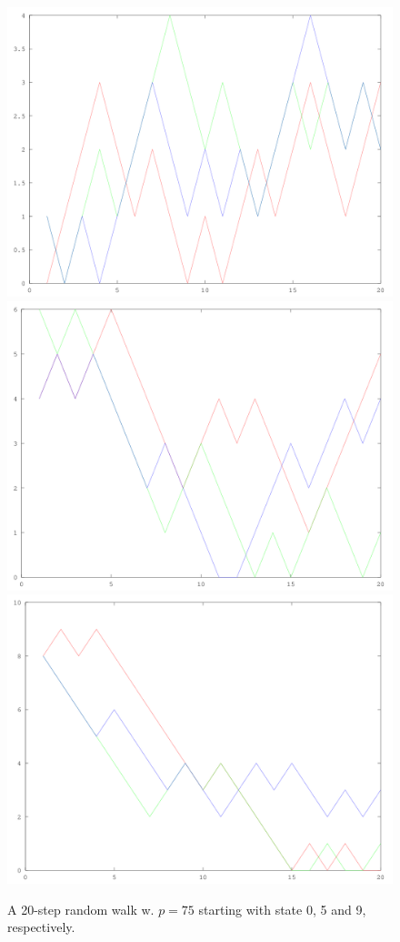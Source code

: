 \begin{figure}[!htbp]
  \includegraphics[width=\textwidth/2]{randwalk0_75.png}
  \includegraphics[width=\textwidth/2]{randwalk5_75.png}
  \includegraphics[width=\textwidth/1]{randwalk9_75.png}
  \caption{A 20-step random walk w. $p=75$ starting with state 0, 5 and 9, respectively.}
  \label{randwalk2}
\end{figure}



